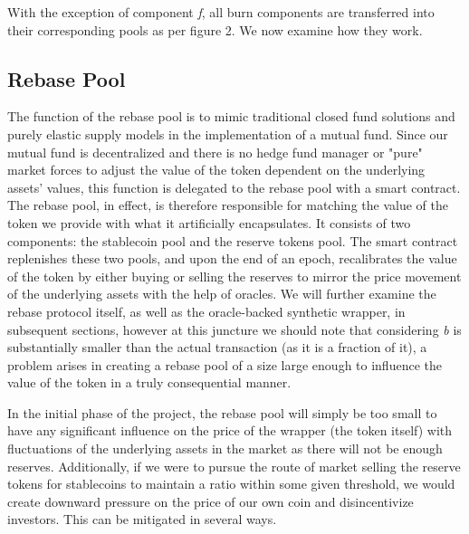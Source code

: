 \documentclass[12pt]{article}
\begin{document}
    With the exception of component \emph{f}, all burn components are transferred into their corresponding pools as per figure 2. We now examine how they work.  \par
    
    \vspace{0.15cm}
    \subsection{Rebase Pool}
    The function of the rebase pool is to mimic traditional closed fund solutions and purely elastic supply models in the implementation of a mutual fund. Since our mutual fund is decentralized and there is no hedge fund manager or "pure" market forces to adjust the value of the token dependent on the underlying assets' values, this function is delegated to the rebase pool with a smart contract. The rebase pool, in effect, is therefore responsible for matching the value of the token we provide with what it artificially encapsulates. It consists of two components: the stablecoin pool and the reserve tokens pool. The smart contract replenishes these two pools, and upon the end of an epoch, recalibrates the value of the token by either buying or selling the reserves to mirror the price movement of the underlying assets with the help of oracles. We will further examine the rebase protocol itself, as well as the oracle-backed synthetic wrapper, in subsequent sections, however at this juncture we should note that considering \emph{b} is substantially smaller than the actual transaction (as it is a fraction of it), a problem arises in creating a rebase pool of a size large enough to influence the value of the token in a truly consequential manner. \par
    
    
    \vspace{0.15cm}
        In the initial phase of the project, the rebase pool will simply be
    too small to have any significant influence on the price of the wrapper (the token itself)
    with fluctuations of the underlying assets in the market as there will not
    be enough reserves. Additionally, if we were to pursue the route of
    market selling the reserve tokens for stablecoins to maintain a ratio
    within some given threshold, we would create downward pressure on the
    price of our own coin and disincentivize investors. This can be mitigated
    in several ways. \par
    
\end{document}

